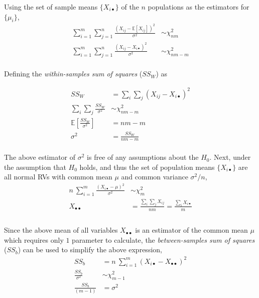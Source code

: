 Using the set of sample means $ \{X_{i\bullet}\} $ of the $ n $ populations as the estimators for $ \{\mu_i\} $, \\

\begin{align}
	\sum\limits_{i = 1}^{m} \sum\limits_{j = 1}^{n} \frac{(X_{ij} - \mathbb{E}[X_{ij}])^2}{\sigma^2} &\sim \chi^2_{nm} \\
	\sum\limits_{i = 1}^{m} \sum\limits_{j = 1}^{n} \frac{(X_{ij} - X_{i\bullet})^2}{\sigma^2} &\sim \chi^2_{nm - m} 
\end{align}\\

Defining the \textit{within-samples sum of squares} ($ SS_W $) as 

\begin{align}
	SS_W &= \sum_{i} \sum_{j} (X_{ij} - X_{i\bullet})^2 \\
	\sum_{i} \sum_{j} \frac{SS_W}{\sigma^2} &\sim \chi^2_{nm-m} \\
	\mathbb{E}\left[\frac{SS_W}{\sigma^2}\right] &= nm - m \\
	\sigma^2 &= \frac{SS_W}{nm-m}
\end{align}\\

The above estimator of $ \sigma^2 $ is free of any assumptions about the $ H_0 $. Next, under the assumption that $ H_0 $ holds, and thus the set of population means $ \{X_{i\bullet}\} $ are all normal RVs with common mean $ \mu $ and common variance $ \sigma^2 / n $, \\

\begin{align}
	n\ \sum\limits_{i = 1}^{m} \frac{(X_{i\bullet} - \mu)^2}{\sigma^2} &\sim \chi^2_{m} \\
	X_{\bullet \bullet} &= \frac{\sum_{i} \sum_{j} X_{ij}}{nm} = \frac{\sum_{i} X_{i\bullet}}{m} \\
\end{align}\\

Since the above mean of all variables $ X_{\bullet \bullet} $ is an estimator of the common mean $ \mu $ which requires only $ 1 $ parameter to calculate, the \textit{between-samples sum of squares} ($ SS_b $) can be used to simplify the above expression,\\

\begin{align}
	SS_b &= n\ \sum\limits_{i = 1}^{m} (X_{i\bullet} - X_{\bullet\bullet})^2 \\
	\frac{SS_b}{\sigma^2} &\sim \chi^2_{m-1} \nonumber \\
	\frac{SS_b}{(m-1)} &= \sigma^2
\end{align}\\

